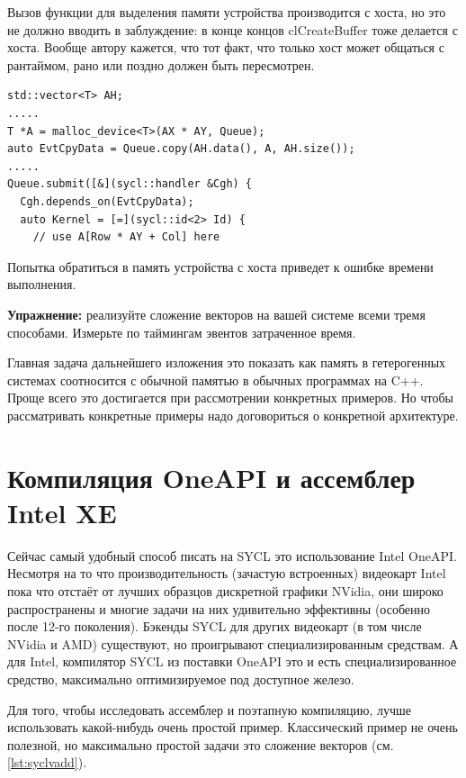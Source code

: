 \documentclass[a4paper,12pt,oneside]{article}
\begin{document}
Вызов функции для выделения памяти устройства производится с хоста, но это не должно вводить в заблуждение: в конце концов clCreateBuffer тоже делается с хоста.
Вообще автору кажется, что тот факт, что только хост может общаться с рантаймом, рано или поздно должен быть пересмотрен.

\begin{lstlisting}[caption={Явная пересылка на устройство},label={lst:devicemem}]
std::vector<T> AH;
.....
T *A = malloc_device<T>(AX * AY, Queue);
auto EvtCpyData = Queue.copy(AH.data(), A, AH.size());
.....
Queue.submit([&](sycl::handler &Cgh) { 
  Cgh.depends_on(EvtCpyData);
  auto Kernel = [=](sycl::id<2> Id) {
    // use A[Row * AY + Col] here
\end{lstlisting}

Попытка обратиться в память устройства с хоста приведет к ошибке времени выполнения.

\textbf{Упражнение:} реализуйте сложение векторов на вашей системе всеми тремя способами. Измерьте по таймингам эвентов затраченное время.

Главная задача дальнейшего изложения это показать как память в гетерогенных системах соотносится с обычной памятью в обычных программах на C++.
Проще всего это достигается при рассмотрении конкретных примеров.
Но чтобы рассматривать конкретные примеры надо договориться о конкретной архитектуре.

\pagebreak
\section{Компиляция OneAPI и ассемблер Intel XE}\label{sec:IntelXE}

Сейчас самый удобный способ писать на SYCL это использование Intel OneAPI.
Несмотря на то что производительность (зачастую встроенных) видеокарт Intel пока что отстаёт от лучших образцов дискретной графики NVidia, они широко распространены и многие задачи на них удивительно эффективны (особенно после 12-го поколения).
Бэкенды SYCL для других видеокарт (в том числе NVidia и AMD) существуют, но проигрывают специализированным средствам.
А для Intel, компилятор SYCL из поставки OneAPI это и есть специализированное средство, максимально оптимизируемое под доступное железо.

Для того, чтобы исследовать ассемблер и поэтапную компиляцию, лучше использовать какой-нибудь очень простой пример.
Классический пример не очень полезной, но максимально простой задачи это сложение векторов (см. \ref{lst:syclvadd}).
\end{document}
